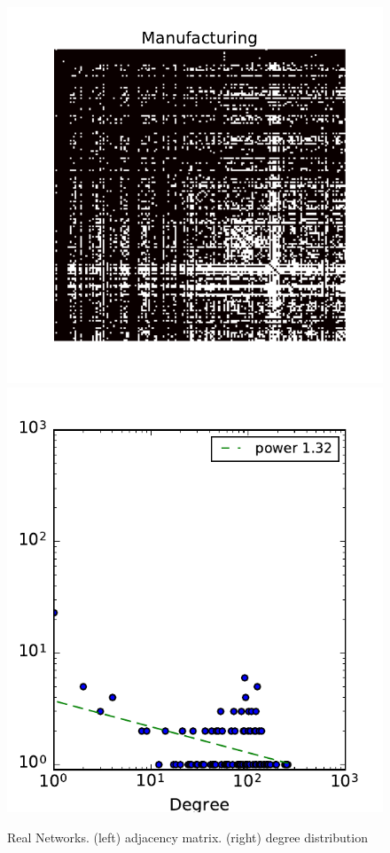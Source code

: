 \begin{figure}[h]
	\endminipage
		\vspace{-0.4cm}
	\includegraphics[scale=0.4]{img/manufacturing}
	\endminipage
	\includegraphics[scale=0.4]{img/manufacturing_d}
	\endminipage
	\caption{Real Networks. (left) adjacency matrix. (right) degree distribution}
	\label{fig:real_graph}
\end{figure}



